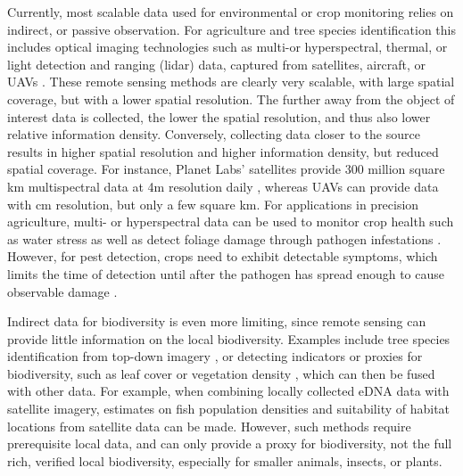 Currently, most scalable data used for environmental or crop monitoring relies on indirect, or passive observation. For agriculture and tree species identification this includes optical imaging technologies such as multi-or hyperspectral, thermal, or light detection and ranging (lidar) data, captured from satellites, aircraft, or UAVs \cite{Tsouros2019, Toth2016, Singh2020, Mahlein2018}. 
These remote sensing methods are clearly very scalable, with large spatial coverage, but with a lower spatial resolution. The further away from the object of interest data is collected, the lower the spatial resolution, and thus also lower relative information density. 
Conversely, collecting data closer to the source results in higher spatial resolution and higher information density, but reduced spatial coverage. For instance, Planet Labs' satellites provide 300 million square km multispectral data at 4m resolution daily \cite{Lab}, whereas UAVs can provide data with cm resolution, but only a few square km.
For applications in precision agriculture, multi- or hyperspectral data can be used to monitor crop health such as water stress as well as detect foliage damage through pathogen infestations \cite{Mahlein2018}. However, for pest detection, crops need to exhibit detectable symptoms, which limits the time of detection until after the pathogen has spread enough to cause observable damage \cite{Mahlein2018}. 
 
Indirect data for biodiversity is even more limiting, since remote sensing can provide little information on the local biodiversity. Examples include tree species identification from top-down imagery \cite{Onishi2021, Schiefer2020, Xu2020a}, or detecting indicators or proxies for biodiversity, such as leaf cover or vegetation density \cite{Skidmore2015}, which can then be fused with other data. For example, when combining locally collected eDNA data with satellite imagery, estimates on fish population densities and suitability of habitat locations from satellite data can be made\cite{Zong2024}. However, such methods require prerequisite local data, and can only provide a proxy for biodiversity, not the full rich, verified local biodiversity, especially for smaller animals, insects, or plants.


